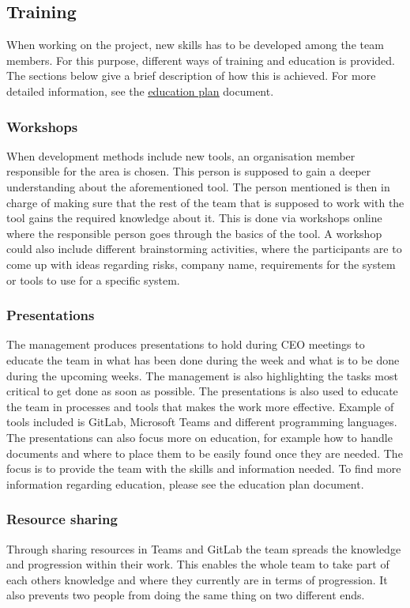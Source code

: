 \subsection{Training}
When working on the project, new skills has to be developed among the team members. For this purpose, different ways of training and education is provided. The sections below give a brief description of how this is achieved. For more detailed information, see the \href{https://gitlab.liu.se/tddc88-company-3-2020/deploy/-/tree/Document_branch/Education_plan}{\underline{education plan}} document. 
\subsubsection{Workshops}
When development methods include new tools, an organisation member responsible for the area is chosen. This person is supposed to gain a deeper understanding about the aforementioned tool. The person mentioned is then in charge of making sure that the rest of the team that is supposed to work with the tool gains the required knowledge about it. This is done via workshops online where the responsible person goes through the basics of the tool.  A workshop could also include different brainstorming activities, where the participants are to come up with ideas regarding risks, company name, requirements for the system or tools to use for a specific system. 

\subsubsection{Presentations}
The management produces presentations to hold during CEO meetings to educate the team in what has been done during the week and what is to be done during the upcoming weeks. The management is also highlighting the tasks most critical to get done as soon as possible. The presentations is also used to educate the team in processes and tools that makes the work more effective. Example of tools included is GitLab, Microsoft Teams and different programming languages. The presentations can also focus more on education, for example how to handle documents and where to place them to be easily found once they are needed. The focus is to provide the team with the skills and information needed. To find more information regarding education, please see the education plan document. 

\subsubsection{Resource sharing}
Through sharing resources in Teams and GitLab the team spreads the knowledge and progression within their work. This enables the whole team to take part of each others knowledge and where they currently are in terms of progression. It also prevents two people from doing the same thing on two different ends. 

